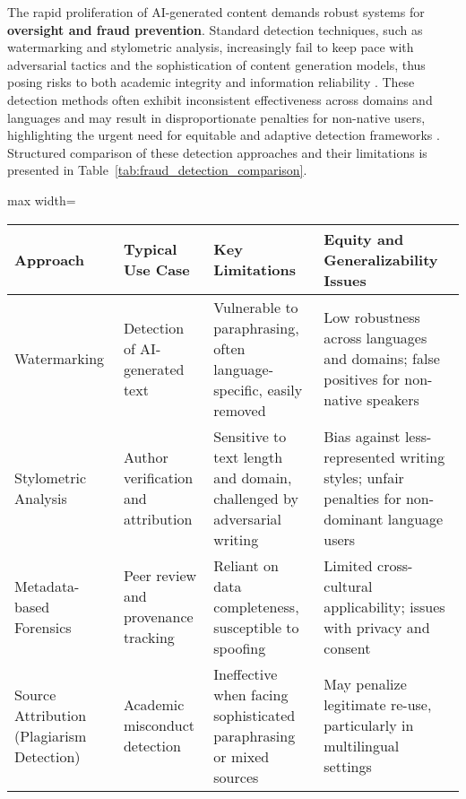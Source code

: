 \documentclass[sigconf]{acmart}
\begin{document}
The rapid proliferation of AI-generated content demands robust systems for \textbf{oversight and fraud prevention}. Standard detection techniques, such as watermarking and stylometric analysis, increasingly fail to keep pace with adversarial tactics and the sophistication of content generation models, thus posing risks to both academic integrity and information reliability \cite{ref76,ref80,ref85,ref104,ref114,ref115,ref117}. These detection methods often exhibit inconsistent effectiveness across domains and languages and may result in disproportionate penalties for non-native users, highlighting the urgent need for equitable and adaptive detection frameworks \cite{ref90,ref92,ref97,ref104,ref112,ref113,ref114}. Structured comparison of these detection approaches and their limitations is presented in Table~\ref{tab:fraud_detection_comparison}.

\begin{table*}[htbp]
\centering
\caption{Comparative Overview of Automated Fraud Detection Approaches in Academic Workflows}
\label{tab:fraud_detection_comparison}
\begin{adjustbox}{max width=\textwidth}
\begin{tabular}{@{}llll@{}}
\toprule
\textbf{Approach}           & \textbf{Typical Use Case}                  & \textbf{Key Limitations}                                         & \textbf{Equity and Generalizability Issues} \\
\midrule
Watermarking                & Detection of AI-generated text & Vulnerable to paraphrasing, often language-specific, easily removed & Low robustness across languages and domains; false positives for non-native speakers \\
Stylometric Analysis        & Author verification and attribution        & Sensitive to text length and domain, challenged by adversarial writing & Bias against less-represented writing styles; unfair penalties for non-dominant language users \\
Metadata-based Forensics    & Peer review and provenance tracking         & Reliant on data completeness, susceptible to spoofing               & Limited cross-cultural applicability; issues with privacy and consent \\
Source Attribution (Plagiarism Detection) & Academic misconduct detection                & Ineffective when facing sophisticated paraphrasing or mixed sources & May penalize legitimate re-use, particularly in multilingual settings \\
\bottomrule
\end{tabular}
\end{adjustbox}
\end{table*}
\end{document}
